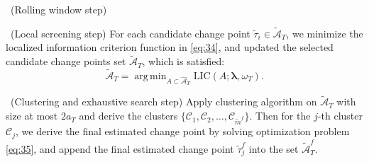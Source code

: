 \documentclass[11pt]{article}
\DeclareMathOperator*{\argmin}{arg\,min}
\begin{document}
\begin{algorithm}[!ht]
    \DontPrintSemicolon
    
    
    
    \ (Rolling window step) \While{$e < T$}{
        \ Apply the single change point detection procedure \eqref{eq:5} on the window $[s, e)$. Append the detected candidate change point $\widetilde{\tau}$ into the candidate change points set $\widehat{\mathcal{A}}_T$. 
        
        \ $s \gets s+l, e \gets e+l$.
    }
    
    \ (Local screening step) For each candidate change point $\widetilde{\tau}_i \in \widetilde{\mathcal{A}}_T$, we minimize the localized information criterion function in \eqref{eq:34}, and updated the selected candidate change points set $\widetilde{\mathcal{A}}_T$, which is satisfied:
    \begin{equation*}
        \widetilde{\mathcal{A}}_T = \argmin_{A\subset \widehat{\mathcal{A}}_T} \text{LIC}(A; \bm{\lambda}, \omega_T).
    \end{equation*}
    
    \ (Clustering and exhaustive search step) Apply clustering algorithm on $\widetilde{\mathcal{A}}_T$ with size at most $2a_T$ and derive the clusters $\{\mathcal{C}_1, \mathcal{C}_2, \dots, \mathcal{C}_{\widetilde{m}^f}\}$. Then for the $j$-th cluster $\mathcal{C}_j$, we derive the final estimated change point by solving optimization problem \eqref{eq:35}, and append the final estimated change point $\widetilde{\tau}^f_j$ into the set $\widetilde{\mathcal{A}}^f_T$.
    
    
    \caption{Rolling-window and local screening procedure.}
    \label{algo:1}
\end{algorithm}
\end{document}
